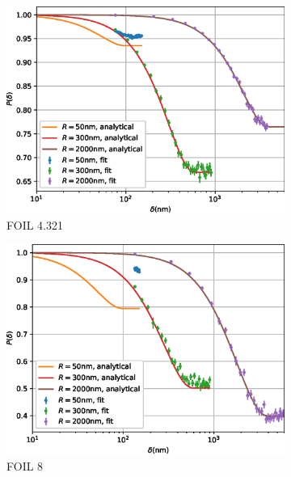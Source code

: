 \begin{figure}[p]
	\centering
	\begin{subfigure}[b]{0.45\textwidth}
		\centering
		\includegraphics[width=\textwidth]{simulation-plot-rms-FOIL-4.321}
		\caption{FOIL 4.321}
		\label{fig:simulation-plot-rms-FOIL-4.321}
	\end{subfigure}
	\hfill
	\begin{subfigure}[b]{0.45\textwidth}
		\centering
		\includegraphics[width=\textwidth]{simulation-plot-rms-FOIL-8}
		\caption{FOIL 8}
		\label{fig:simulation-plot-rms-FOIL-8}
	\end{subfigure}
	\centering
	\begin{subfigure}[b]{0.45\textwidth}
		\centering

\end{subfigure}
\end{figure}
